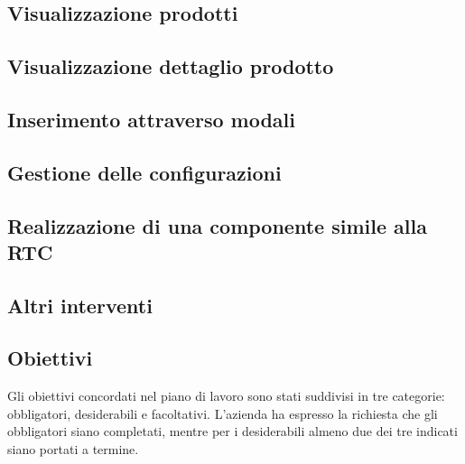 \subsection{Visualizzazione prodotti}
\subsection{Visualizzazione dettaglio prodotto}
\subsection{Inserimento attraverso modali}
\subsection{Gestione delle configurazioni}
\subsection{Realizzazione di una componente simile alla RTC}
\subsection{Altri interventi}


\subsection{Obiettivi}
Gli obiettivi concordati nel piano di lavoro sono stati suddivisi in tre categorie: obbligatori, desiderabili e facoltativi. L'azienda ha espresso la richiesta che gli obbligatori siano completati, mentre per i desiderabili almeno due dei tre indicati siano portati a termine. \\
 
